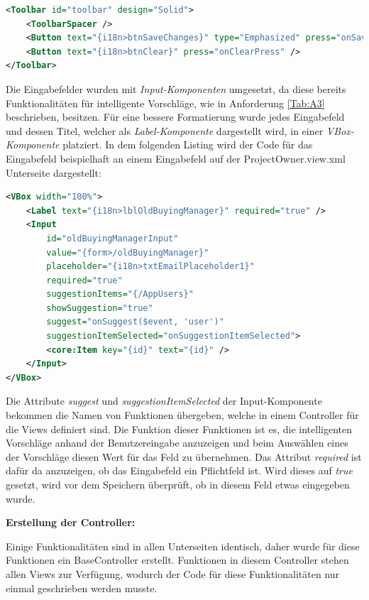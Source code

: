 \begin{lstlisting}[caption={Toolbar der Unterseiten}, label={lst:toolbar}, language={XML}]
<Toolbar id="toolbar" design="Solid">
    <ToolbarSpacer />
    <Button text="{i18n>btnSaveChanges}" type="Emphasized" press="onSaveChangesPress" />
    <Button text="{i18n>btnClear}" press="onClearPress" />
</Toolbar>
\end{lstlisting}

Die Eingabefelder wurden mit \textit{Input-Komponenten} umgesetzt, da diese bereits Funktionalitäten für intelligente Vorschläge, wie in Anforderung \ref{Tab:A3} beschrieben, besitzen.
Für eine bessere Formatierung wurde jedes Eingabefeld und dessen Titel, welcher als \textit{Label-Komponente} dargestellt wird, in einer \textit{VBox-Komponente} platziert.
In dem folgenden Listing wird der Code für das Eingabefeld beispielhaft an einem Eingabefeld auf der ProjectOwner.view.xml Unterseite dargestellt:

\begin{lstlisting}[caption={Eingabefeld für Unterseiten}, language={XML}]
<VBox width="100%">
    <Label text="{i18n>lblOldBuyingManager}" required="true" />
    <Input
        id="oldBuyingManagerInput"
        value="{form>/oldBuyingManager}"
        placeholder="{i18n>txtEmailPlaceholder1}"
        required="true"
        suggestionItems="{/AppUsers}"
        showSuggestion="true"
        suggest="onSuggest($event, 'user')"
        suggestionItemSelected="onSuggestionItemSelected">
        <core:Item key="{id}" text="{id}" />
    </Input>
</VBox>
\end{lstlisting}

Die Attribute \textit{suggest} und \textit{suggestionItemSelected} der Input-Komponente bekommen die Namen von Funktionen übergeben, welche in einem Controller für die Views definiert sind.
Die Funktion dieser Funktionen ist es, die intelligenten Vorschläge anhand der Benutzereingabe anzuzeigen und beim Auswählen eines der Vorschläge diesen Wert für das Feld zu übernehmen.
Das Attribut \textit{required} ist dafür da anzuzeigen, ob das Eingabefeld ein Pflichtfeld ist.
Wird dieses auf \textit{true} gesetzt, wird vor dem Speichern überprüft, ob in diesem Feld etwas eingegeben wurde.

\textbf{Erstellung der Controller:}

Einige Funktionalitäten sind in allen Unterseiten identisch, daher wurde für diese Funktionen ein BaseController erstellt.
Funktionen in diesem Controller stehen allen Views zur Verfügung, wodurch der Code für diese Funktionalitäten nur einmal geschrieben werden musste.

